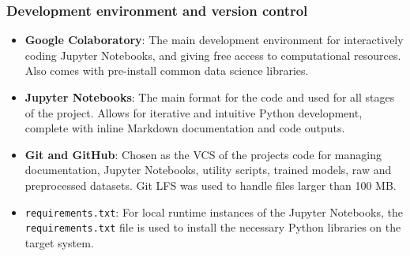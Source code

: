 
\subsubsection*{Development environment and version control}

\begin{itemize}
  \item \textbf{Google Colaboratory}: The main development environment for interactively coding Jupyter Notebooks, and giving free access to computational resources. Also comes with pre-install common data science libraries.
  \item \textbf{Jupyter Notebooks}: The main format for the code and used for all stages of the project. Allows for iterative and intuitive Python development, complete with inline Markdown documentation and code outputs.
  \item \textbf{Git and GitHub}: Chosen as the VCS of the projects code for managing documentation, Jupyter Notebooks, utility scripts, trained models, raw and preprocessed datasets. Git LFS was used to handle files larger than 100 MB.
  \item \texttt{requirements.txt}: For local runtime instances of the Jupyter Notebooks, the \texttt{requirements.txt} file is used to install the necessary Python libraries on the target system.
\end{itemize}

